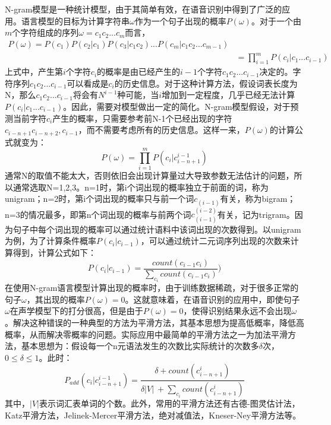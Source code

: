 N-gram模型是一种统计模型，由于其简单有效，在语音识别中得到了广泛的应用。语言模型的目标为计算字符串$\omega$作为一个句子出现的概率$P(\omega)$。对于一个由$m$个字符组成的序列$\omega=c_1 c_2...c_m$而言，
\begin{eqnarray}
  P(\omega) = P(c_1)P(c_2|c_1)P(c_3|c_1 c_2)...P(c_m|c_1 c_2...c_{m-1}) \\
          & = \prod\limits_{i=1}^m P(c_i|c_1...c_{i-1})
\end{eqnarray}
上式中，产生第$i$个字符$c_i$的概率是由已经产生的$i-1$个字符$c_1 c_2...c_{i-1}$决定的。字符序列$c_1 c_2...c_{i-1}$可以看成是$c_i$的历史信息。对于这种计算方法，假设词表长度为N，那么$c_1 c_2...c_{i-1}$将会有$N^{i-1}$种可能，当$i$增加到一定程度，几乎已经无法计算$P(c_i|c_1...c_{i-1})$。因此，需要对模型做出一定的简化。N-gram模型假设，对于预测当前字符$c_i$产生的概率，只需要参考前N-1个已经出现的字符$c_{i-n+1} c_{i-n+2}, c_{i-1}$，而不需要考虑所有的历史信息。这样一来，$P(\omega)$的计算公式就变为：
\begin{equation}P(\omega) = \prod\limits_{i=1}^m P(c_i|c_{i-n+1}^{i-1})\end{equation}
通常N的取值不能太大，否则依旧会出现计算量过大导致参数无法估计的问题，所以通常选取N=1,2,3。n=1时，第i个词出现的概率独立于前面的词，称为unigram；n=2时，第i个词出现的概率只与前一个词$c_(i-1)$有关，称为bigram；n=3的情况最多，即第n个词出现的概率与前两个词$c_(i-1)^(i-2)$有关，记为trigram。因为句子中每个词出现的概率可以通过统计语料中该词出现的次数得到。以unigram为例，为了计算条件概率$P(c_i|c_{i-1})$，可以通过统计二元词序列出现的次数来计算得到，计算公式如下：
\begin{equation}P(c_i|c_{i-1})=\frac{count(c_{i-1} c_i)}{\sum\limits_{c_i} count(c_{i-1} c_i)})\end{equation}
在使用N-gram语言模型计算出现的概率时，由于训练数据稀疏，对于很多正常的句子$\omega$，其出现的概率$P(\omega)=0$。这就意味着，在语音识别的应用中，即使句子$\omega$在声学模型下的打分很高，但是由于$P(\omega)=0$，使得识别结果永远不会出现$\omega$。解决这种错误的一种典型的方法为平滑方法，其基本思想为提高低概率，降低高概率，从而解决零概率的问题。实际应用中最简单的平滑方法之一为加法平滑方法，基本思想为：假设每一个n元语法发生的次数比实际统计的次数多$\delta$次，$0\leqslant \delta \leqslant 1$。此时：
\begin{equation}P_{add}(c_i|c_{i-n+1}^{i-1})=\frac{\delta+count(c_{i-n+1}^{i})}{\delta \lvert V\rvert\ + \sum\limits_{c_i} count(c_{i-n+1}^i)}\end{equation}
其中，$\lvert V\rvert$表示词汇表单词的个数。此外，常用的平滑方法还有古德-图灵估计法，Katz平滑方法，Jelinek-Mercer平滑方法，绝对减值法，Kneser-Ney平滑方法等。
